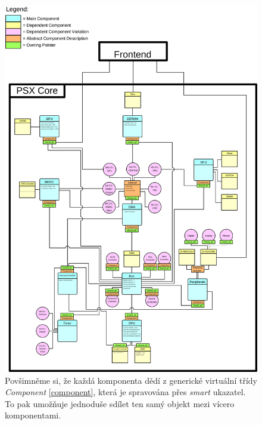 \begin{figure}[hbt]
\centering
\includegraphics[width=1.0\textwidth]{obrazky-figures/psx-arch-detailed.png}
\caption[Detailní návrh architektury jádra emulátoru]{Povšimněme si, že každá komponenta dědí z generické virtuální třídy \textit{Component} \ref{component}, která je spravována přes \textit{smart} ukazatel.
To pak umožňuje jednoduše sdílet ten samý objekt mezi vícero komponentami.}
\label{psx-layout-detailed}
\end{figure}